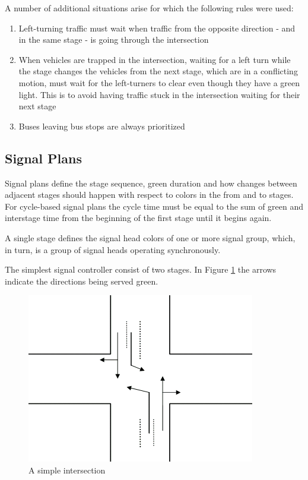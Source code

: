 A number of additional situations arise for which the following rules were used:

\begin{enumerate}
\item Left-turning traffic must wait when traffic from the opposite direction - and in the same stage - is going through the intersection
\item When vehicles are trapped in the intersection, waiting for a left turn while the stage changes the vehicles from the next stage, which are in a conflicting motion, must wait for the left-turners to clear even though they have a green light. This is to avoid having traffic stuck in the intersection waiting for their next stage
\item Buses leaving bus stops are always prioritized
\end{enumerate}


\subsection{Signal Plans}
Signal plans define the stage sequence, green duration and how changes between adjacent stages should happen with respect to colors in the from and to stages. For cycle-based signal plans the cycle time must be equal to the sum of green and interstage time from the beginning of the first stage until it begins again.

A single stage defines the signal head colors of one or more signal group, which, in turn, is a group of signal heads operating synchronously.

The simplest signal controller consist of two stages. In  Figure \ref{fig:simple_intersection} the arrows indicate the directions being served green.

\begin{figure}[!ht]
\centering
\includegraphics[scale=0.5]{simple_intersection.png} 
\caption{A simple intersection}
\label{fig:simple_intersection}
\end{figure}

